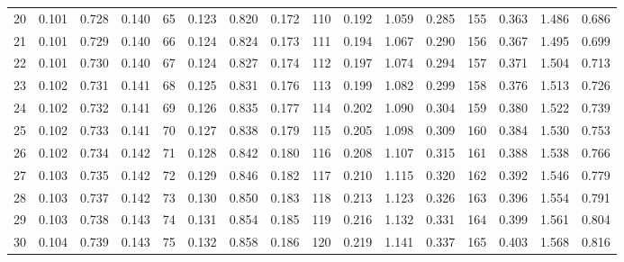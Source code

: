 \begin{table}
{\begin{tabular}{rrrr|rrrr|rrrr|crrr}
 20 & \tiny{  0.101} &   0.728 & \tiny{  0.140} &  65 & \tiny{  0.123} &   0.820 & \tiny{  0.172} & 110 & \tiny{  0.192} &   1.059 & \tiny{  0.285} & 155 & \tiny{  0.363} &   1.486 & \tiny{  0.686}\\
 21 & \tiny{  0.101} &   0.729 & \tiny{  0.140} &  66 & \tiny{  0.124} &   0.824 & \tiny{  0.173} & 111 & \tiny{  0.194} &   1.067 & \tiny{  0.290} & 156 & \tiny{  0.367} &   1.495 & \tiny{  0.699}\\
 22 & \tiny{  0.101} &   0.730 & \tiny{  0.140} &  67 & \tiny{  0.124} &   0.827 & \tiny{  0.174} & 112 & \tiny{  0.197} &   1.074 & \tiny{  0.294} & 157 & \tiny{  0.371} &   1.504 & \tiny{  0.713}\\
 23 & \tiny{  0.102} &   0.731 & \tiny{  0.141} &  68 & \tiny{  0.125} &   0.831 & \tiny{  0.176} & 113 & \tiny{  0.199} &   1.082 & \tiny{  0.299} & 158 & \tiny{  0.376} &   1.513 & \tiny{  0.726}\\
 24 & \tiny{  0.102} &   0.732 & \tiny{  0.141} &  69 & \tiny{  0.126} &   0.835 & \tiny{  0.177} & 114 & \tiny{  0.202} &   1.090 & \tiny{  0.304} & 159 & \tiny{  0.380} &   1.522 & \tiny{  0.739}\\
 25 & \tiny{  0.102} &   0.733 & \tiny{  0.141} &  70 & \tiny{  0.127} &   0.838 & \tiny{  0.179} & 115 & \tiny{  0.205} &   1.098 & \tiny{  0.309} & 160 & \tiny{  0.384} &   1.530 & \tiny{  0.753}\\
 26 & \tiny{  0.102} &   0.734 & \tiny{  0.142} &  71 & \tiny{  0.128} &   0.842 & \tiny{  0.180} & 116 & \tiny{  0.208} &   1.107 & \tiny{  0.315} & 161 & \tiny{  0.388} &   1.538 & \tiny{  0.766}\\
 27 & \tiny{  0.103} &   0.735 & \tiny{  0.142} &  72 & \tiny{  0.129} &   0.846 & \tiny{  0.182} & 117 & \tiny{  0.210} &   1.115 & \tiny{  0.320} & 162 & \tiny{  0.392} &   1.546 & \tiny{  0.779}\\
 28 & \tiny{  0.103} &   0.737 & \tiny{  0.142} &  73 & \tiny{  0.130} &   0.850 & \tiny{  0.183} & 118 & \tiny{  0.213} &   1.123 & \tiny{  0.326} & 163 & \tiny{  0.396} &   1.554 & \tiny{  0.791}\\
 29 & \tiny{  0.103} &   0.738 & \tiny{  0.143} &  74 & \tiny{  0.131} &   0.854 & \tiny{  0.185} & 119 & \tiny{  0.216} &   1.132 & \tiny{  0.331} & 164 & \tiny{  0.399} &   1.561 & \tiny{  0.804}\\
 30 & \tiny{  0.104} &   0.739 & \tiny{  0.143} &  75 & \tiny{  0.132} &   0.858 & \tiny{  0.186} & 120 & \tiny{  0.219} &   1.141 & \tiny{  0.337} & 165 & \tiny{  0.403} &   1.568 & \tiny{  0.816}\\

\end{tabular}}
\end{table}
